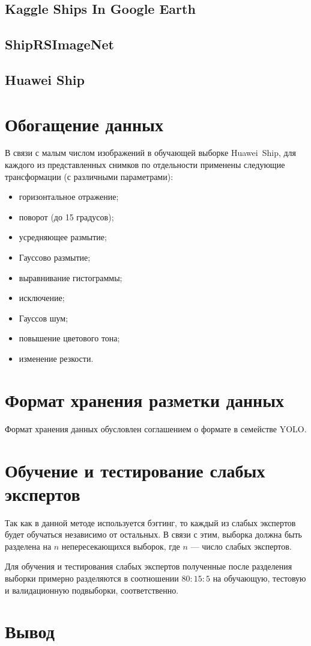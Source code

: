 \subsection*{Kaggle Ships In Google Earth}

\subsection*{ShipRSImageNet}

\subsection*{Huawei Ship}

\section{Обогащение данных}

В связи с малым числом изображений в обучающей выборке Huawei~Ship, для каждого из представленных снимков по отдельности применены следующие трансформации (с различными параметрами):
\begin{itemize}[label=---]
    \item горизонтальное отражение;
    \item поворот (до 15 градусов);
    \item усредняющее размытие;
    \item Гауссово размытие;
    \item выравнивание гистограммы;
    \item исключение;
    \item Гауссов шум;
    \item повышение цветового тона;
    \item изменение резкости.
\end{itemize}

\section{Формат хранения разметки данных}

Формат хранения данных обусловлен соглашением о формате в семействе YOLO.

\section{Обучение и тестирование слабых экспертов}

Так как в данной методе используется бэггинг, то каждый из слабых экспертов будет обучаться независимо от остальных. В связи с этим, выборка должна быть разделена на $n$ непересекающихся выборок, где $n$ --- число слабых экспертов.

Для обучения и тестирования слабых экспертов полученные после разделения выборки примерно разделяются в соотношении $80:15:5$ на обучающую, тестовую и валидационную подвыборки, соответственно.

\section{Вывод}